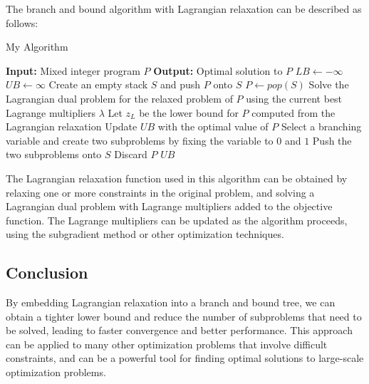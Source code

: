 The branch and bound algorithm with Lagrangian relaxation can be described as follows:

\begin{algorithm}
\caption{My Algorithm}
\begin{algorithmic}[1]
\State \textbf{Input:} Mixed integer program $P$
\State \textbf{Output:} Optimal solution to $P$
\State $LB \leftarrow -\infty$ 
\State $UB \leftarrow \infty$ 
\State Create an empty stack $S$ and push $P$ onto $S$
    \State $P \leftarrow pop(S)$ 
    \State Solve the Lagrangian dual problem for the relaxed problem of $P$ using the current best Lagrange multipliers $\lambda$
    \State Let $z_L$ be the lower bound for $P$ computed from the Lagrangian relaxation
            \State Update $UB$ with the optimal value of $P$
        \Else
            \State Select a branching variable and create two subproblems by fixing the variable to $0$ and $1$
            \State Push the two subproblems onto $S$
        \EndIf
    \Else
        \State Discard $P$
    \EndIf
\EndWhile
\State \Return $UB$
\end{algorithmic}
\end{algorithm}

The Lagrangian relaxation function used in this algorithm can be obtained by relaxing one or more constraints in the original problem, and solving a Lagrangian dual problem with Lagrange multipliers added to the objective function. The Lagrange multipliers can be updated as the algorithm proceeds, using the subgradient method or other optimization techniques.

\subsection{Conclusion}

By embedding Lagrangian relaxation into a branch and bound tree, we can obtain a tighter lower bound and reduce the number of subproblems that need to be solved, leading to faster convergence and better performance. This approach can be applied to many other optimization problems that involve difficult constraints, and can be a powerful tool for finding optimal solutions to large-scale optimization problems.


